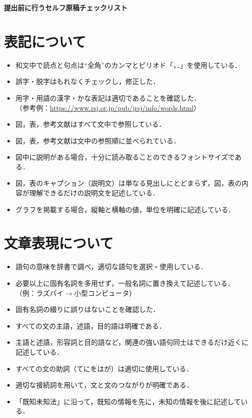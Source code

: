 \documentclass[a4paper,11pt,dvipdfmx]{jlreq}
\begin{document}
\begin{center}
\textbf{\Large
提出前に行うセルフ原稿チェックリスト %
}
\normalsize
\end{center}

\pagestyle{fancy}


\renewcommand{\labelitemi}{$\Box$\ }
\section{表記について}
\begin{itemize}
 \item 和文中で読点と句点は``全角''のカンマとピリオド「，．」を使用している．
 \item 誤字・脱字はもれなくチェックし，修正した．
 \item 用字・用語の漢字・かな表記は適切であることを確認した．\\
（参考例：\url{https://www.rsj.or.jp/pub/jrsj/info/words.html}）
 \item 図，表，参考文献はすべて文中で参照している．
 \item 図，表，参考文献は文中の参照順に並べられている．
 \item 図中に説明がある場合，十分に読み取ることのできるフォントサイズである．
 \item 図，表のキャプション（説明文）は単なる見出しにとどまらず，図，表の内容が理解できるだけの説明文を記述している．
 \item グラフを掲載する場合，縦軸と横軸の値，単位を明確に記述している．
 \end{itemize}

\section{文章表現について}
\begin{itemize}
 \item 語句の意味を辞書で調べ，適切な語句を選択・使用している．
 \item 必要以上に固有名詞を多用せず，一般名詞に置き換えて記述している．\\ 
（例：ラズパイ$\rightarrow$小型コンピュータ）
 \item 固有名詞の綴りに誤りはないことを確認した．
 \item すべての文の主語，述語，目的語は明確である．
 \item 主語と述語，形容詞と目的語など，関連の強い語句同士はできるだけ近くに記述している． \\
 \item すべての文の助詞（てにをはが）は適切に使用している．
 \item 適切な接続詞を用いて，文と文のつながりが明確である．
 \item 「既知未知法」に沿って，既知の情報を先に，未知の情報を後に記述している．
\end{itemize}
\end{document}

